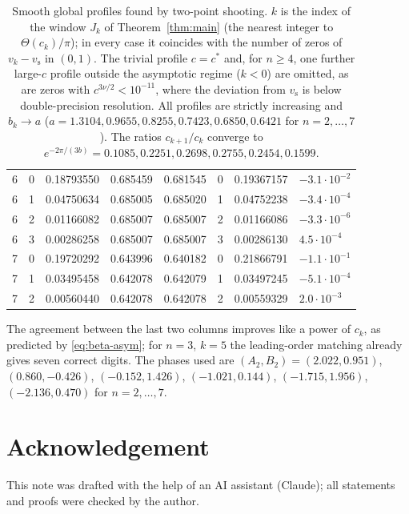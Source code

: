 \documentclass[11pt,a4paper]{amsart}
\theoremstyle{definition}
\theoremstyle{remark}
\newcommand{\cstar}{c^{*}}
\newcommand{\vs}{v_{\mathrm{s}}}
\begin{document}
\begin{table}[ht]
\begin{tabular}{rrllllll}
6 & 0 & 0.18793550 & 0.685459 & 0.681545 & 0 & 0.19367157 & $-3.1\cdot10^{-2}$\\
6 & 1 & 0.04750634 & 0.685005 & 0.685020 & 1 & 0.04752238 & $-3.4\cdot10^{-4}$\\
6 & 2 & 0.01166082 & 0.685007 & 0.685007 & 2 & 0.01166086 & $-3.3\cdot10^{-6}$\\
6 & 3 & 0.00286258 & 0.685007 & 0.685007 & 3 & 0.00286130 & $4.5\cdot10^{-4}$\\ \midrule
7 & 0 & 0.19720292 & 0.643996 & 0.640182 & 0 & 0.21866791 & $-1.1\cdot10^{-1}$\\
7 & 1 & 0.03495458 & 0.642078 & 0.642079 & 1 & 0.03497245 & $-5.1\cdot10^{-4}$\\
7 & 2 & 0.00560440 & 0.642078 & 0.642078 & 2 & 0.00559329 & $2.0\cdot10^{-3}$\\ \bottomrule
\end{tabular}
\caption{Smooth global profiles found by two-point shooting.  $k$ is the index of the window $J_k$ of Theorem~\ref{thm:main} (the nearest integer to $\Theta(c_k)/\pi$); in every case it coincides with the number of zeros of $v_k-\vs$ in $(0,1)$.  The trivial profile $c=\cstar$ and, for $n\ge4$, one further large-$c$ profile outside the asymptotic regime ($k<0$) are omitted, as are zeros with $c^{3\nu/2}<10^{-11}$, where the deviation from $\vs$ is below double-precision resolution.  All profiles are strictly increasing and $b_k\to a$ ($a=1.3104, 0.9655, 0.8255, 0.7423, 0.6850, 0.6421$ for $n=2,\dots,7$).  The ratios $c_{k+1}/c_k$ converge to $e^{-2\pi/(3b)}=0.1085, 0.2251, 0.2698, 0.2755, 0.2454, 0.1599$.}
\label{tab:num}
\end{table}

The agreement between the last two columns improves like a power of $c_k$, as predicted by \eqref{eq:beta-asym}; for $n=3$, $k=5$ the leading-order matching already gives seven correct digits.  The phases used are $(A_2,B_2)=(2.022,0.951)$, $(0.860,-0.426)$, $(-0.152,1.426)$, $(-1.021,0.144)$, $(-1.715,1.956)$, $(-2.136,0.470)$ for $n=2,\dots,7$.

\section*{Acknowledgement}
This note was drafted with the help of an AI assistant (Claude); all statements and proofs were checked by the author.
\end{document}

